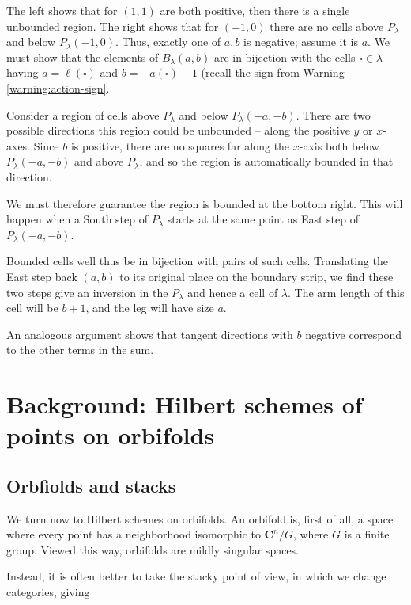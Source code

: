 \documentclass{amsart}[12pt]
\theoremstyle{definition}
\newcommand{\C}{\mathbf{C}}
\begin{document}
The left shows that for $(1,1)$ are both positive, then there is a single unbounded region.  The right shows that for $(-1,0)$ there are no cells above $P_\lambda$ and below $P_\lambda(-1,0)$.
Thus, exactly one of $a,b$ is negative; assume it is $a$.  We must show that the elements of $B_\lambda(a,b)$ are in bijection with the cells $\square\in\lambda$ having  $a=\ell(\square)$ and $b=-a(\square)-1$ (recall the sign from Warning \ref{warning:action-sign}.

Consider a region of cells above $P_\lambda$ and below $P_\lambda(-a,-b)$.  There are two possible directions this region could be unbounded -- along the positive $y$ or $x$-axes.  Since $b$ is positive, there are no squares far along the $x$-axis both below $P_\lambda(-a,-b)$  and above $P_\lambda$, and so the region is automatically bounded in that direction.  

We must therefore guarantee the region is bounded at the bottom right.  This will happen when a South step of $P_\lambda$ starts at the same point as East step of $P_\lambda(-a,-b)$.  




Bounded cells well thus be in bijection with pairs of such cells.  Translating the East step back $(a,b)$ to its original place on the boundary strip, we find these two steps give an inversion in the $P_\lambda$ and hence a cell of $\lambda$.  The arm length of this cell will be $b+1$, and the leg will have size $a$. 

An analogous argument shows that tangent directions with $b$ negative correspond to the other terms in the sum.




\section{Background: Hilbert schemes of points on orbifolds}


\subsection{Orbfiolds and stacks}
We turn now to Hilbert schemes on orbifolds.  An orbifold is, first of all, a space where every point has a neighborhood isomorphic to $\C^n/G$, where $G$ is a finite group.  Viewed this way, orbifolds are mildly singular spaces.  

Instead, it is often better to take the stacky point of view, in which we change categories, giving 
\end{document}
